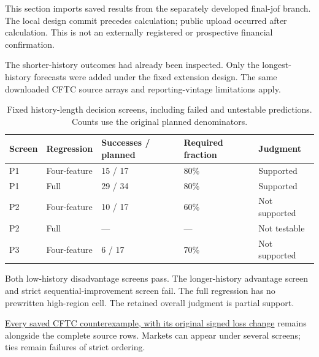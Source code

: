 \documentclass[10pt,a4paper]{article}
\begin{document}
This section imports saved results from the separately developed final-jof branch. The local design commit precedes calculation; public upload occurred after calculation. This is not an externally registered or prospective financial confirmation.

The shorter-history outcomes had already been inspected. Only the longest-history forecasts were added under the fixed extension design. The same downloaded CFTC source arrays and reporting-vintage limitations apply.

\begin{table}[htbp]\centering\small

\caption{Fixed history-length decision screens, including failed and untestable predictions. Counts use the original planned denominators.}\label{tab:submission-wp2}

\begin{tabular}{lllll}\toprule

Screen & Regression & Successes / planned & Required fraction & Judgment\\\midrule

P1 & Four-feature & 15 / 17 & 80\% & Supported\\

P1 & Full & 29 / 34 & 80\% & Supported\\

P2 & Four-feature & 10 / 17 & 60\% & Not supported\\

P2 & Full & --- & --- & Not testable\\

P3 & Four-feature & 6 / 17 & 70\% & Not supported\\

\bottomrule\end{tabular}\end{table}

Both low-history disadvantage screens pass. The longer-history advantage screen and strict sequential-improvement screen fail. The full regression has no prewritten high-region cell. The retained overall judgment is partial support.

\href{https://github.com/ByronLi0207/financial-mathematics-paper-20261020/blob/submission-final/EXTENDED_RESULTS.md#asmbi-extended-s39}{Every saved CFTC counterexample, with its original signed loss change} remains alongside the complete source rows. Markets can appear under several screens; ties remain failures of strict ordering.

\FloatBarrier
\end{document}
